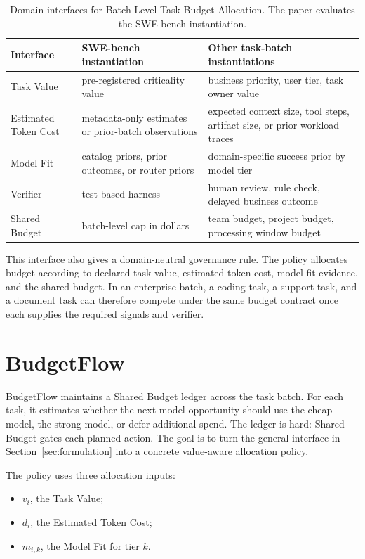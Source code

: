 \documentclass[sigconf,review,anonymous]{acmart}
\newcommand{\method}{BudgetFlow\xspace}
\newcommand{\taskvalue}{Task Value\xspace}
\newcommand{\tokencost}{Estimated Token Cost\xspace}
\newcommand{\modelfit}{Model Fit\xspace}
\newcommand{\sharedbudget}{Shared Budget\xspace}
\newcommand{\verifier}{Verifier\xspace}
\begin{document}
\begin{table}[t]
\centering
\small
\begin{tabular}{p{}p{}p{}}
\toprule
Interface & SWE-bench instantiation & Other task-batch instantiations \\
\midrule
\taskvalue & pre-registered criticality value & business priority, user tier, task owner value \\
\tokencost & metadata-only estimates or prior-batch observations & expected context size, tool steps, artifact size, or prior workload traces \\
\modelfit & catalog priors, prior outcomes, or router priors & domain-specific success prior by model tier \\
\verifier & test-based harness & human review, rule check, delayed business outcome \\
\sharedbudget & batch-level cap in dollars & team budget, project budget, processing window budget \\
\bottomrule
\end{tabular}
\caption{Domain interfaces for Batch-Level Task Budget Allocation. The paper evaluates the SWE-bench instantiation.}
\label{tab:interfaces}
\vspace{0.6em}
\end{table}

This interface also gives a domain-neutral governance rule. The policy allocates budget according to declared task value, estimated token cost, model-fit evidence, and the shared budget. In an enterprise batch, a coding task, a support task, and a document task can therefore compete under the same budget contract once each supplies the required signals and verifier.

\section{BudgetFlow}
\label{sec:method}
\method maintains a \sharedbudget ledger across the task batch. For each task, it estimates whether the next model opportunity should use the cheap model, the strong model, or defer additional spend. The ledger is hard: \sharedbudget gates each planned action. The goal is to turn the general interface in Section~\ref{sec:formulation} into a concrete value-aware allocation policy.

The policy uses three allocation inputs:

\begin{itemize}
    \item $v_i$, the \taskvalue;
    \item $d_i$, the \tokencost;
    \item $m_{i,k}$, the \modelfit for tier $k$.
\end{itemize}
\end{document}
